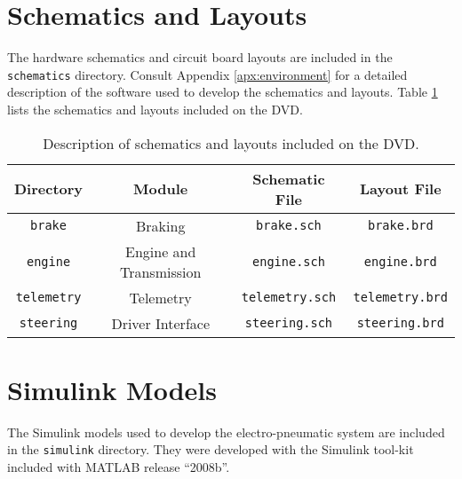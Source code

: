 \section*{Schematics and Layouts}

The hardware schematics and circuit board layouts are included in the \texttt{schematics} directory. Consult Appendix \ref{apx:environment} for a detailed description of the software used to develop the schematics and layouts. Table \ref{tbl:attached_schematics} lists the schematics  and layouts included on the DVD.

\begin{table}[H]
\caption{Description of schematics and layouts included on the DVD.}
\centering
\begin{tabular}{|c|c|c|c|}
	\hline 
	Directory & Module & Schematic File & Layout File \\ 
	\hline
	\hline
	\texttt{brake} & Braking  & \texttt{brake.sch} & \texttt{brake.brd} \\
	\hline	
	\texttt{engine} & Engine and Transmission & \texttt{engine.sch} & \texttt{engine.brd} \\
	\hline	
	\texttt{telemetry} & Telemetry & \texttt{telemetry.sch} & \texttt{telemetry.brd} \\
	\hline	
	\texttt{steering} & Driver Interface & \texttt{steering.sch} & \texttt{steering.brd} \\			
	\hline	
\end{tabular}
\label{tbl:attached_schematics}
\end{table}

\section*{Simulink Models}

The Simulink models used to develop the electro-pneumatic system are included in the \texttt{simulink} directory. They were developed with the Simulink tool-kit included with MATLAB release ``2008b''.
